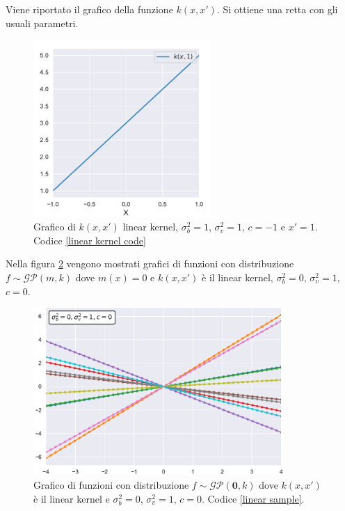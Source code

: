 Viene riportato il grafico della funzione $k(x,x')$. Si ottiene una retta con gli usuali parametri.
\begin{figure}[h]
    \centering
    \includegraphics[width=0.6\textwidth]{images/Gaussian process/Linear Kernel.pdf}
    \caption{Grafico di $k(x,x')$ linear kernel, $\sigma_b^2=1$, $\sigma_v^2=1$, $c=-1$ e $x'=1$. Codice \ref{linear kernel code}}
    \label{linear kernel}
\end{figure}

\newpage

Nella figura \ref{10 sample linear kernel zero mean} vengono mostrati grafici di funzioni con distribuzione $f\sim \mathcal{GP}(m,k)$ dove $m(x)=0$ e $k(x,x')$ è il linear kernel, $\sigma_b^2=0$, $\sigma_v^2=1$, $c=0$.



\begin{figure}[h]
    \centering
    \includegraphics[width=0.85\textwidth]{images/Gaussian process/Linear sample.pdf}
    \caption{Grafico di funzioni con distribuzione  $f\sim \mathcal{GP}(\bm{0},k)$ dove $k(x,x')$ è il linear kernel e $\sigma_b^2=0$, $\sigma_v^2=1$, $c=0$. Codice \ref{linear sample}.}
    \label{10 sample linear kernel zero mean}
\end{figure}

